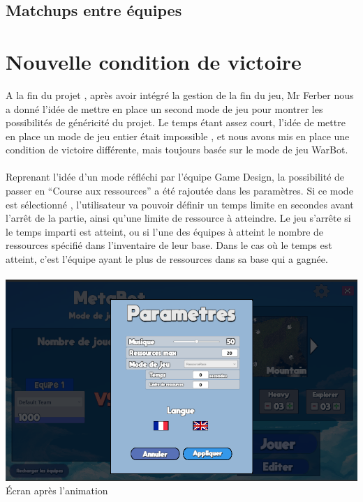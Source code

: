 \documentclass{report}
\begin{document}
\paragraph{}

\subsection{Matchups entre équipes}

\newpage
\section{Nouvelle condition de victoire}
A la fin du projet , après avoir intégré la gestion de la fin du jeu, Mr Ferber nous a donné l’idée de mettre en place un second mode de jeu pour montrer les possibilités de généricité du projet. Le temps étant assez court, l’idée de mettre en place un mode de jeu entier était impossible , et nous avons mis en place une condition de victoire différente, mais toujours basée sur le mode de jeu WarBot.
\paragraph{}
Reprenant l’idée d’un mode réfléchi par l’équipe Game Design, la possibilité de passer en “Course aux ressources” a été rajoutée dans les paramètres. Si ce mode est sélectionné , l’utilisateur va pouvoir définir un temps limite en secondes avant l’arrêt de la partie, ainsi qu’une limite de ressource à atteindre. Le jeu s’arrête si le temps imparti est atteint, ou si l’une des équipes à atteint le nombre de ressources spécifié dans l’inventaire de leur base. Dans le cas où le temps est atteint, c’est l’équipe ayant le plus de ressources dans sa base qui a gagnée. 

\paragraph{}
\begin{center}
\includegraphics[scale=0.5]{DATA/param.png}
 {Écran après l’animation}
\end{center}
\end{document}
